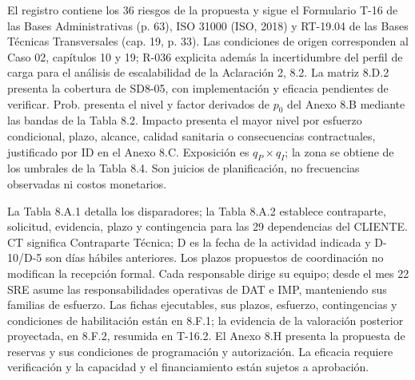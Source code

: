 \documentclass[carta,firma,sinnotas]{lafrox}
\begin{document}
\portadalafrox
\preliminareslafrox
\setcounter{chapter}{7}

El registro contiene los 36 riesgos de la propuesta y sigue el Formulario T-16 de las Bases Administrativas (p. 63), ISO 31000 (ISO, 2018) y RT-19.04 de las Bases Técnicas Transversales (cap. 19, p. 33). Las condiciones de origen corresponden al Caso 02, capítulos 10 y 19; R-036 explicita además la incertidumbre del perfil de carga para el análisis de escalabilidad de la Aclaración 2, 8.2. La matriz 8.D.2 presenta la cobertura de SD8-05, con implementación y eficacia pendientes de verificar. Prob. presenta el nivel y factor derivados de $p_0$ del Anexo 8.B mediante las bandas de la Tabla 8.2. Impacto presenta el mayor nivel por esfuerzo condicional, plazo, alcance, calidad sanitaria o consecuencias contractuales, justificado por ID en el Anexo 8.C. Exposición es $q_P\times q_I$; la zona se obtiene de los umbrales de la Tabla 8.4. Son juicios de planificación, no frecuencias observadas ni costos monetarios.

La Tabla 8.A.1 detalla los disparadores; la Tabla 8.A.2 establece contraparte, solicitud, evidencia, plazo y contingencia para las 29 dependencias del CLIENTE. CT significa Contraparte Técnica; D es la fecha de la actividad indicada y D-10/D-5 son días hábiles anteriores. Los plazos propuestos de coordinación no modifican la recepción formal. Cada responsable dirige su equipo; desde el mes 22 SRE asume las responsabilidades operativas de DAT e IMP, manteniendo sus familias de esfuerzo. Las fichas ejecutables, sus plazos, esfuerzo, contingencias y condiciones de habilitación están en 8.F.1; la evidencia de la valoración posterior proyectada, en 8.F.2, resumida en T-16.2. El Anexo 8.H presenta la propuesta de reservas y sus condiciones de programación y autorización. La eficacia requiere verificación y la capacidad y el financiamiento están sujetos a aprobación.
\end{document}
